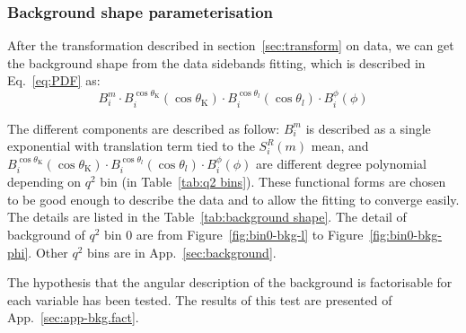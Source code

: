 \subsubsection{Background shape parameterisation}
\label{sec:backg}

After the transformation described in section~\ref{sec:transform} on
data, we can get the background shape from the data sidebands fitting,
which is described in Eq.~\ref{eq:PDF} as:
$$B_i^m \cdot B_i^{\cos\theta_\mathrm{K}}(\cos\theta_\mathrm{K}) \cdot
B_i^{\cos\theta_l}(\cos\theta_l) \cdot B_i^{\phi}(\phi) $$

The different components are described as follow: $B_i^m$ is described as a single exponential with translation term tied to the $S^R_i(m)$ mean, and $B_i^{\cos\theta_\mathrm{K}}(\cos\theta_\mathrm{K}) \cdot B_i^{\cos\theta_l}(\cos\theta_l) \cdot B_i^{\phi}(\phi)$ are different degree polynomial depending on $q^2$ bin (in Table~\ref{tab:q2 bins}).
These functional forms are chosen to be good enough to describe the
data and to allow the fitting to converge easily. The details are
listed in the Table~\ref{tab:background shape}. The detail of background 
of $q^2$ bin 0 are from Figure~\ref{fig:bin0-bkg-l} to Figure~\ref{fig:bin0-bkg-phi}.
Other $q^2$ bins are in App.~\ref{sec:background}.

The hypothesis that the angular description of the background is factorisable for each variable has been tested. The results of this test are presented of App.~\ref{sec:app-bkg.fact}.

